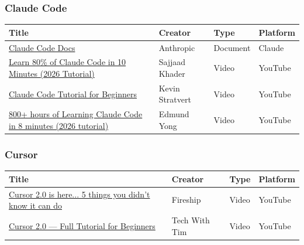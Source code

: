 \documentclass[12pt]{article}
\begin{document}
            \subsubsection{Claude Code}

            \setlength{\tabcolsep}{4pt}
            \begin{tabular}{p{} p{} p{} p{}}
            \hline
            \textbf{Title} & \textbf{Creator} & \textbf{Type} & \textbf{Platform} \\
            \hline
            \href{https://code.claude.com/docs/en/quickstart}{Claude Code Docs} & Anthropic & Document & Claude \\[4pt]
            \href{https://www.youtube.com/watch?v=3aKVArutiIU}{Learn 80\% of Claude Code in 10 Minutes (2026 Tutorial)} & Sajjaad Khader & Video & YouTube \\[4pt]
            \href{https://www.youtube.com/watch?v=eMZmDH3T2bY}{Claude Code Tutorial for Beginners} & Kevin Stratvert & Video & YouTube \\[4pt]
            \href{https://www.youtube.com/watch?v=Ffh9OeJ7yxw}{800+ hours of Learning Claude Code in 8 minutes (2026 tutorial)} & Edmund Yong & Video & YouTube \\[4pt]
            \hline
            \end{tabular}

            \subsubsection{Cursor}

            \setlength{\tabcolsep}{4pt}
            \begin{tabular}{p{} p{} p{} p{}}
            \hline
            \textbf{Title} & \textbf{Creator} & \textbf{Type} & \textbf{Platform} \\
            \hline
            \href{https://www.youtube.com/watch?v=HIp8sFB2GGw}{Cursor 2.0 is here... 5 things you didn't know it can do} & Fireship & Video & YouTube \\[4pt]
            \href{https://www.youtube.com/watch?v=l30Eb76Tk5s}{Cursor 2.0 --- Full Tutorial for Beginners} & Tech With Tim & Video & YouTube \\[4pt]
            \hline
            \end{tabular}
        
        \newpage
        \newpage
        \label{appendix:e}
\end{document}
